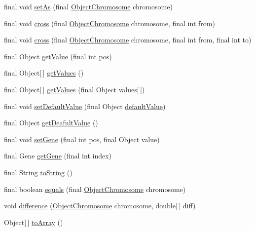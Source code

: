 \begin{DoxyCompactItemize}
\item 
final void \hyperlink{classjenes_1_1chromosome_1_1_object_chromosome_a77fd7d633e3663ea8fb63db2857bb1b7}{set\-As} (final \hyperlink{classjenes_1_1chromosome_1_1_object_chromosome}{Object\-Chromosome} chromosome)
\item 
final void \hyperlink{classjenes_1_1chromosome_1_1_object_chromosome_a8f0770f15071e71ee86d7ad43541118f}{cross} (final \hyperlink{classjenes_1_1chromosome_1_1_object_chromosome}{Object\-Chromosome} chromosome, final int from)
\item 
final void \hyperlink{classjenes_1_1chromosome_1_1_object_chromosome_a25225ffc89dae70e0b0ddeb21f8f125d}{cross} (final \hyperlink{classjenes_1_1chromosome_1_1_object_chromosome}{Object\-Chromosome} chromosome, final int from, final int to)
\item 
final Object \hyperlink{classjenes_1_1chromosome_1_1_object_chromosome_af221c16bbcd9f03867d2e4295216cc93}{get\-Value} (final int pos)
\item 
final Object\mbox{[}$\,$\mbox{]} \hyperlink{classjenes_1_1chromosome_1_1_object_chromosome_af41d722cff36fbb837c0038c885de04c}{get\-Values} ()
\item 
final Object\mbox{[}$\,$\mbox{]} \hyperlink{classjenes_1_1chromosome_1_1_object_chromosome_a7476459dce852e9a7fce5d35276817e8}{get\-Values} (final Object values\mbox{[}$\,$\mbox{]})
\item 
final void \hyperlink{classjenes_1_1chromosome_1_1_object_chromosome_a44d425a777314b8e9de58b680e686454}{set\-Default\-Value} (final Object \hyperlink{classjenes_1_1chromosome_1_1_object_chromosome_af5e2ac0b5272d948ec566f824baa3411}{default\-Value})
\item 
final Object \hyperlink{classjenes_1_1chromosome_1_1_object_chromosome_aea3da542f5b0d9c3300dc76cec3385f9}{get\-Deafult\-Value} ()
\item 
final void \hyperlink{classjenes_1_1chromosome_1_1_object_chromosome_ae68b9a0568dfc16f4f543438e54ac0ea}{set\-Gene} (final int pos, final Object value)
\item 
final Gene \hyperlink{classjenes_1_1chromosome_1_1_object_chromosome_abadaf50e19a5fd0ac5279de47914af99}{get\-Gene} (final int index)
\item 
final String \hyperlink{classjenes_1_1chromosome_1_1_object_chromosome_a660652ffc502cace60aceb16a5854de3}{to\-String} ()
\item 
final boolean \hyperlink{classjenes_1_1chromosome_1_1_object_chromosome_abeb710a44460d3699bf991590c41574a}{equals} (final \hyperlink{classjenes_1_1chromosome_1_1_object_chromosome}{Object\-Chromosome} chromosome)
\item 
void \hyperlink{classjenes_1_1chromosome_1_1_object_chromosome_a8afa1cbf1df7b9d65a9a8c34f476aa67}{difference} (\hyperlink{classjenes_1_1chromosome_1_1_object_chromosome}{Object\-Chromosome} chromosome, double\mbox{[}$\,$\mbox{]} diff)
\item 
Object\mbox{[}$\,$\mbox{]} \hyperlink{classjenes_1_1chromosome_1_1_object_chromosome_add9ff43a69d5991043baa4423877f255}{to\-Array} ()
\end{DoxyCompactItemize}
